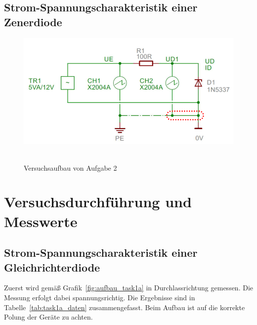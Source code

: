 \documentclass{article}
\begin{document}
\subsection{Strom-Spannungscharakteristik einer Zenerdiode}

\begin{figure}[H]
\caption{Versuchsaufbau von Aufgabe 2}
\label{fig:aufbau_task2}
{\centering
\includegraphics[scale=1.7]{bilder/aufbau_task2.png}
~
}
\end{figure}



\section{Versuchsdurchführung und Messwerte}

\subsection{Strom-Spannungscharakteristik einer Gleichrichterdiode}

Zuerst wird gemäß Grafik~\ref{fig:aufbau_task1a} in Durchlassrichtung gemessen. Die Messung erfolgt dabei spannungsrichtig. Die Ergebnisse sind in Tabelle~\ref{tab:task1a_daten} zusammengefasst. Beim Aufbau ist auf die korrekte Polung der Geräte zu achten.
\end{document}

